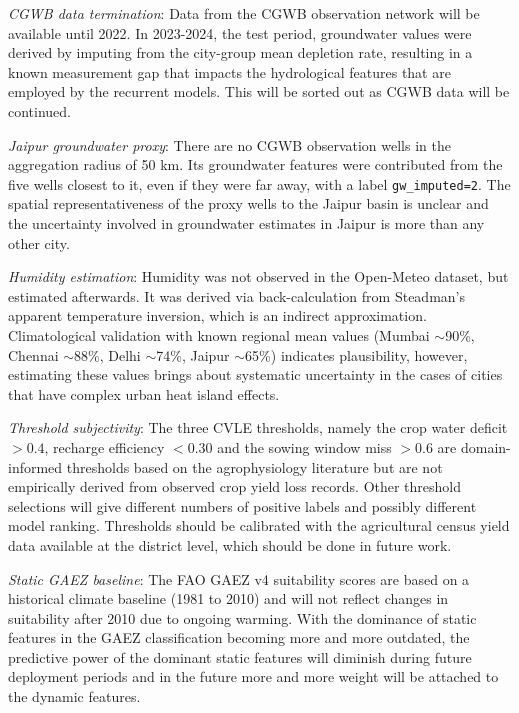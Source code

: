 \documentclass{ieeeaccess}
\begin{document}
\textit{CGWB data termination}: Data from the CGWB observation network will be available until 2022. In 2023-2024, the test period, groundwater values were derived by imputing from the city-group mean depletion rate, resulting in a known measurement gap that impacts the hydrological features that are employed by the recurrent models. This will be sorted out as CGWB data will be continued.

\textit{Jaipur groundwater proxy}: There are no CGWB observation wells in the aggregation radius of 50 km. Its groundwater features were contributed from the five wells closest to it, even if they were far away, with a label \texttt{gw\_imputed=2}. The spatial representativeness of the proxy wells to the Jaipur basin is unclear and the uncertainty involved in groundwater estimates in Jaipur is more than any other city.

\textit{Humidity estimation}: Humidity was not observed in the Open-Meteo dataset, but estimated afterwards. It was derived via back-calculation from Steadman's apparent temperature inversion, which is an indirect approximation. Climatological validation with known regional mean values (Mumbai $\sim$90\%, Chennai $\sim$88\%, Delhi $\sim$74\%, Jaipur $\sim$65\%) indicates plausibility, however, estimating these values brings about systematic uncertainty in the cases of cities that have complex urban heat island effects.

\textit{Threshold subjectivity}: The three CVLE thresholds, namely the crop water deficit $> 0.4$, recharge efficiency $< 0.30$ and the sowing window miss $> 0.6$ are domain-informed thresholds based on the agrophysiology literature but are not empirically derived from observed crop yield loss records. Other threshold selections will give different numbers of positive labels and possibly different model ranking. Thresholds should be calibrated with the agricultural census yield data available at the district level, which should be done in future work.

\textit{Static GAEZ baseline}: The FAO GAEZ v4 suitability scores are based on a historical climate baseline (1981 to 2010) and will not reflect changes in suitability after 2010 due to ongoing warming. With the dominance of static features in the GAEZ classification becoming more and more outdated, the predictive power of the dominant static features will diminish during future deployment periods and in the future more and more weight will be attached to the dynamic features.

\end{document}

